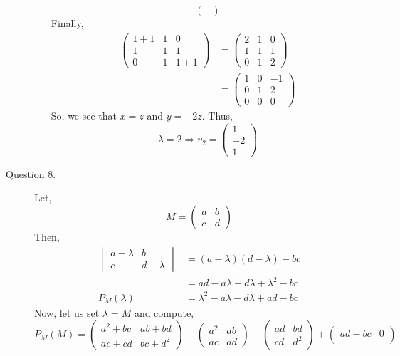 \documentclass[letterpaper,10pt]{article}
\begin{document}
\begin{description}
\begin{enumerate}[label=\alph*.]
\[\begin{pmatrix}
\end{pmatrix}\]
Finally,
\begin{align*}
\begin{pmatrix}
1+1 & 1 & 0\\
1 & 1 & 1\\
0 & 1 & 1+1
\end{pmatrix} &= \begin{pmatrix}
2 & 1 & 0\\
1 & 1 & 1\\
0 & 1 & 2
\end{pmatrix}\\
&= \begin{pmatrix}
1 & 0 & -1\\
0 & 1 & 2\\
0 & 0 & 0
\end{pmatrix}
\end{align*}
So, we see that $x=z$ and $y=-2z$. Thus,
\[\lambda=2\Rightarrow v_2=\begin{pmatrix}
1\\-2\\1
\end{pmatrix}\]
\end{enumerate}
\item[Question 8.] Let,
\[M=\begin{pmatrix}
a & b\\
c & d
\end{pmatrix}\]
Then,
\begin{align*}
\begin{vmatrix}
a-\lambda & b\\
c & d-\lambda
\end{vmatrix} &= (a-\lambda)(d-\lambda)-bc\\
&=ad-a\lambda-d\lambda+\lambda^2-bc\\
P_M(\lambda)&=\lambda^2-a\lambda-d\lambda+ad-bc
\end{align*}
Now, let us set $\lambda=M$ and compute,
\[P_M(M)=\begin{pmatrix}
a^2+bc & ab+bd\\
ac+cd & bc+d^2
\end{pmatrix}-\begin{pmatrix}
a^2 & ab\\
ac & ad
\end{pmatrix}-\begin{pmatrix}
ad & bd\\
cd & d^2
\end{pmatrix}+\begin{pmatrix}
ad-bc & 0\\

\end{pmatrix}\]
\end{description}
\end{document}
